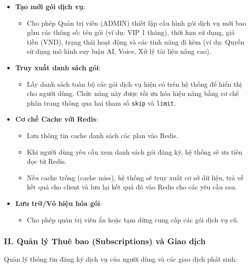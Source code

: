 \begin{itemize}
\item \textbf{Tạo mới gói dịch vụ}:
\begin{itemize}
\item Cho phép Quản trị viên (ADMIN) thiết lập cấu hình gói dịch vụ mới bao gồm các thông số: tên gói (ví dụ: VIP 1 tháng), thời hạn sử dụng, giá tiền (VND), trạng thái hoạt động và các tính năng đi kèm (ví dụ: Quyền sử dụng mô hình suy luận AI, Voice, Xử lý tài liệu nâng cao).
\end{itemize}

\item \textbf{Truy xuất danh sách gói}:
\begin{itemize}
\item Lấy danh sách toàn bộ các gói dịch vụ hiện có trên hệ thống để hiển thị cho người dùng. Chức năng này được tối ưu hóa hiệu năng bằng cơ chế phân trang thông qua hai tham số \texttt{skip} và \texttt{limit}.
\end{itemize}

\item \textbf{Cơ chế Cache với Redis}:
\begin{itemize}
\item Lưu thông tin cache danh sách các plan vào Redis.
\item Khi người dùng yêu cầu xem danh sách gói đăng ký, hệ thống sẽ ưu tiên đọc từ Redis.
\item Nếu cache trống (cache miss), hệ thống sẽ truy xuất cơ sở dữ liệu, trả về kết quả cho client và lưu lại kết quả đó vào Redis cho các yêu cầu sau.
\end{itemize}

\item \textbf{Lưu trữ/Vô hiệu hóa gói}:
\begin{itemize}
\item Cho phép quản trị viên ẩn hoặc tạm dừng cung cấp các gói dịch vụ cũ.
\end{itemize}
\end{itemize}

\subsubsection{II. Quản lý Thuê bao (Subscriptions) và Giao dịch}

Quản lý thông tin đăng ký dịch vụ của người dùng và các giao dịch phát sinh:

